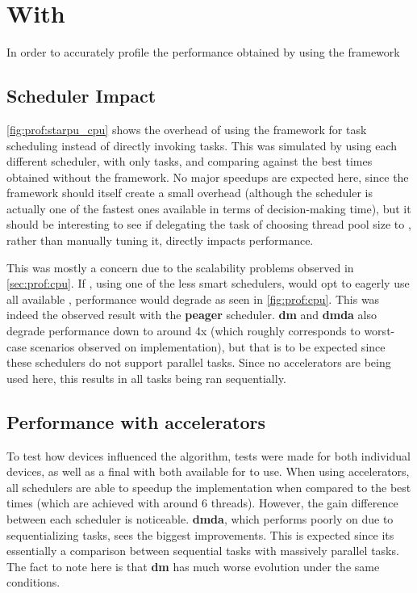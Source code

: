 \documentclass[main.tex]{subfiles}
\begin{document}
\section{With \starpu}

In order to accurately profile the performance obtained by using the framework

\subsection{Scheduler Impact}

\cref{fig:prof:starpu_cpu} shows the overhead of using the framework for task scheduling instead of directly invoking tasks. This was simulated by using each different scheduler, with only \cpu tasks, and comparing against the best \cpu times obtained without the framework. No major speedups are expected here, since the framework should itself create a small overhead (although the scheduler is actually one of the fastest ones available in terms of decision-making time), but it should be interesting to see if delegating the task of choosing \openmp thread pool size to \starpu, rather than manually tuning it, directly impacts performance.

This was mostly a concern due to the scalability problems observed in \cref{sec:prof:cpu}. If \starpu, using one of the less smart schedulers, would opt to eagerly use all available \cpus, performance would degrade as seen in \cref{fig:prof:cpu}. This was indeed the observed result with the \textbf{peager} scheduler. \textbf{dm} and \textbf{dmda} also degrade performance down to around 4x (which roughly corresponds to worst-case scenarios observed on \cpu implementation), but that is to be expected since these schedulers do not support parallel tasks. Since no accelerators are being used here, this results in all tasks being ran sequentially.


\subsection{Performance with accelerators}

To test how \cuda devices influenced the algorithm, tests were made for both individual \cuda devices, as well as a final with both \gpus available for \starpu to use.
When using accelerators, all schedulers are able to speedup the implementation when compared to the best \cpu times (which are achieved with around 6 threads). However, the gain difference between each scheduler is noticeable. \textbf{dmda}, which performs poorly on \cpu due to sequentializing tasks, sees the biggest improvements. This is expected since its essentially a comparison between sequential \cpu tasks with massively parallel \cuda tasks. The fact to note here is that \textbf{dm} has much worse evolution under the same conditions.
\end{document}
